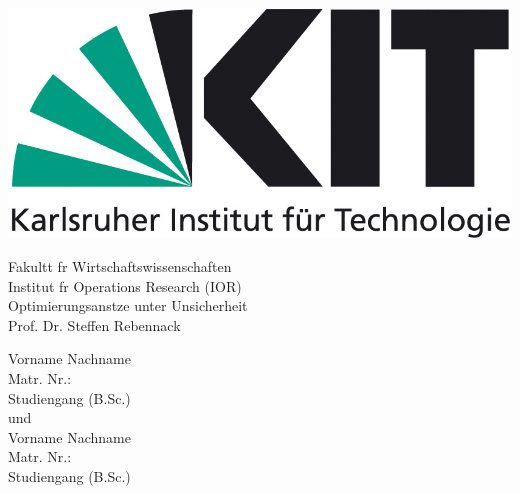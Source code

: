 \documentclass[a4paper,12pt]{article}
\begin{document}
\begin{titlepage}
    \begin{center}
        \vspace*{-80pt}
        \includegraphics[scale=0.25]{img/kit_logo.png}

        \vspace*{40pt}

        Fakultt fr Wirtschaftswissenschaften \\[1ex]
        Institut fr Operations Research (IOR) \\[1ex]
        Optimierungsanstze unter Unsicherheit \\[1ex]
        Prof. Dr. Steffen Rebennack          

        \vspace*{25pt}   

        \vspace*{35pt}

        \fboxsep 40pt
        \fboxrule 6pt

        \vspace*{40pt}

        \normalsize

        Vorname Nachname\\
        Matr. Nr.:\\
        Studiengang (B.Sc.)\\[4ex]

        und \\[4ex]

        Vorname Nachname\\
        Matr. Nr.:\\
        Studiengang (B.Sc.)\\[4ex]
    \end{center}
\end{titlepage}
\end{document}

